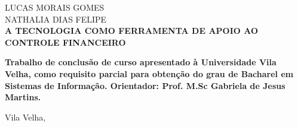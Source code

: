 ﻿
\begin{center}

    {\large LUCAS MORAIS GOMES \\ NATHALIA DIAS FELIPE\\}
    \vspace{8cm}
    {\Large \textsc\textbf{{A TECNOLOGIA COMO FERRAMENTA DE APOIO AO CONTROLE FINANCEIRO} }\\}
    \vspace{1cm}
    \hspace{.45\linewidth}
    \begin{minipage}{.50\linewidth}

            \textbf{Trabalho de conclusão de curso apresentado à Universidade Vila Velha, como requisito parcial para obtenção do grau de Bacharel em Sistemas de Informação. Orientador: Prof. M.Sc Gabriela de Jesus Martins. }

           
    
    \end{minipage}

    \vspace{2cm}
    \vfill
    {\large Vila Velha, \the\year{}}
\end{center}

